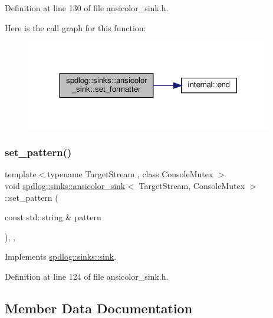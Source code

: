 Definition at line 130 of file ansicolor\+\_\+sink.\+h.

Here is the call graph for this function\+:
\nopagebreak
\begin{figure}[H]
\begin{center}
\leavevmode
\includegraphics[width=305pt]{classspdlog_1_1sinks_1_1ansicolor__sink_a030c3495398d4f320ad444ca940b4731_cgraph}
\end{center}
\end{figure}
\mbox{\label{classspdlog_1_1sinks_1_1ansicolor__sink_ab84f8a9299e060e55dcfbe333806aedc}} 
\subsubsection{\texorpdfstring{set\+\_\+pattern()}{set\_pattern()}}
{\footnotesize\ttfamily template$<$typename Target\+Stream , class Console\+Mutex $>$ \\
void \hyperlink{classspdlog_1_1sinks_1_1ansicolor__sink}{spdlog\+::sinks\+::ansicolor\+\_\+sink}$<$ Target\+Stream, Console\+Mutex $>$\+::set\+\_\+pattern (\begin{DoxyParamCaption}\item[{const std\+::string \&}]{pattern }\end{DoxyParamCaption})\hspace{0.3cm}{\ttfamily [inline]}, {\ttfamily [final]}, {\ttfamily [virtual]}}



Implements \hyperlink{classspdlog_1_1sinks_1_1sink_a7e5cfd4b683c8bfa8fbd602d7f409632}{spdlog\+::sinks\+::sink}.



Definition at line 124 of file ansicolor\+\_\+sink.\+h.



\subsection{Member Data Documentation}
\mbox{\label{classspdlog_1_1sinks_1_1ansicolor__sink_afe5bffc4e1d4977d2a351c8772f2f676}} 

